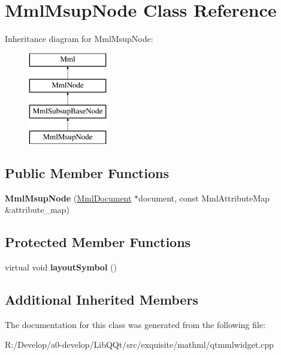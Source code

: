 \hypertarget{class_mml_msup_node}{}\section{Mml\+Msup\+Node Class Reference}
\label{class_mml_msup_node}
Inheritance diagram for Mml\+Msup\+Node\+:\begin{figure}[H]
\begin{center}
\leavevmode
\includegraphics[height=4.000000cm]{class_mml_msup_node}
\end{center}
\end{figure}
\subsection*{Public Member Functions}
\begin{DoxyCompactItemize}
\item 
\mbox{\label{class_mml_msup_node_a4284cd5330c84872d0459620c4c41bdf}} 
{\bfseries Mml\+Msup\+Node} (\mbox{\hyperlink{class_mml_document}{Mml\+Document}} $\ast$document, const Mml\+Attribute\+Map \&attribute\+\_\+map)
\end{DoxyCompactItemize}
\subsection*{Protected Member Functions}
\begin{DoxyCompactItemize}
\item 
\mbox{\label{class_mml_msup_node_af7753ebc2c4e6c638966f90fce6c134a}} 
virtual void {\bfseries layout\+Symbol} ()
\end{DoxyCompactItemize}
\subsection*{Additional Inherited Members}


The documentation for this class was generated from the following file\+:\begin{DoxyCompactItemize}
\item 
R\+:/\+Develop/a0-\/develop/\+Lib\+Q\+Qt/src/exquisite/mathml/qtmmlwidget.\+cpp\end{DoxyCompactItemize}
